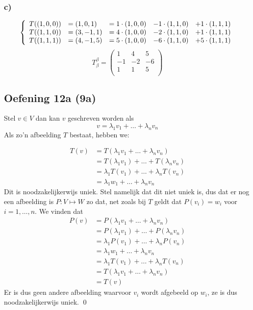 \documentclass[lineaire_algebra_oplossingen.tex]{subfiles}
\begin{document}
\subsubsection*{c)}
\[
\left\lbrace
\begin{array}{c l c c c}
T((1,0,0)) &= (1,0,1) &= 1\cdot (1,0,0) &- 1\cdot (1,1,0) &+ 1\cdot (1,1,1)\\
T((1,1,0)) &= (3,-1,1)&= 4\cdot (1,0,0) &- 2\cdot (1,1,0) &+ 1\cdot (1,1,1)\\
T((1,1,1)) &= (4,-1,5)&= 5\cdot (1,0,0) &- 6\cdot (1,1,0) &+ 5\cdot (1,1,1)\\
\end{array}
\right.
\]
\[
T_\beta^\beta = 
\begin{pmatrix}
1 & 4 & 5\\
-1 & -2 & -6\\
1 & 1 & 5\\
\end{pmatrix}
\]


\subsection{Oefening 12a (9a)}
Stel $v \in V$ dan kan $v$ geschreven worden als
$$v = \lambda_1v_1 + \dots + \lambda_nv_n$$
Als zo'n afbeelding $T$ bestaat, hebben we:

\begin{align*}
T(v) &= T( \lambda_1v_1 + \dots + \lambda_nv_n)\\
&=T( \lambda_1v_1) + \dots + T( \lambda_nv_n)\\
& = \lambda_1T(v_1) + \dots + \lambda_nT(v_n)\\
&= \lambda_1w_1 + \dots +  \lambda_nv_n
\end{align*}
Dit is noodzakelijkerwijs uniek. Stel namelijk dat dit niet uniek is, dus dat er nog een afbeelding is $P:V \mapsto W$ zo dat, net zoals bij $T$ geldt dat $P(v_i) = w_i$ voor $i=1, \dots, n$.
We vinden dat
\begin{align*}
P(v) &= P(\lambda_1v_1 + \dots + \lambda_nv_n)\\
&=P( \lambda_1v_1) + \dots + P( \lambda_nv_n)\\
& = \lambda_1P(v_1) + \dots + \lambda_nP(v_n)\\
&= \lambda_1w_1 + \dots +  \lambda_nv_n\\
& = \lambda_1T(v_1) + \dots + \lambda_nT(v_n)\\
&= T( \lambda_1v_1 + \dots + \lambda_nv_n)\\
& = T(v)
\end{align*}
Er is dus geen andere afbeelding waarvoor $v_i$ wordt afgebeeld op $w_i$, ze is dus noodzakelijkerwijs uniek. \qed
\end{document}
